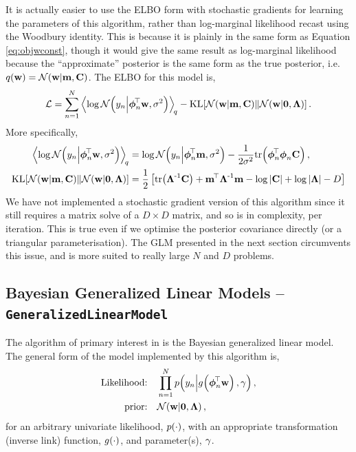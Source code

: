 \documentclass[11pt, oneside]{article}
\begin{document}
It is actually easier to use the ELBO form with stochastic gradients for
learning the parameters of this algorithm, rather than log-marginal likelihood
recast using the Woodbury identity.  This is because it is plainly in the same
form as Equation \eqref{eq:objwconst}, though it would give the same result as
log-marginal likelihood because the ``approximate'' posterior is the same form
as the true posterior, i.e.\ $q\!\left({\mathbf{w}}\right) = \mathcal{N}\!\left({\mathbf{w}}\middle\vert{\ensuremath{\mathbf{m}},
    \ensuremath{\mathbf{C}}}\right)$. The ELBO for this model is,
\begin{equation}
    \elbo = \sum^N_{n=1} 
    \expec{q}{\log\gausC{\targs_n}{\feats_n\T\weights, \var}}
    - \KL{\gausC{\weights}{\pomean, \pocov}}
        {\gausC{\weights}{\mathbf{0}, \Reg}}.
    \label{eq:slmobj}
\end{equation}
More specifically,
\begin{align*}
    \expec{q}{\log\gausC{\targs_n}{\feats_n\T\weights, \var}} &=
    \log \gausC{\targs_n}{\feats_n\T\pomean, \var}
    - \frac{1}{2 \var} \trace{\feats_n\T\feats_n\pocov}, \\
    \KL{\gausC{\weights}{\pomean, \pocov}}
        {\gausC{\weights}{\mathbf{0}, \Reg}} &=
        \frac{1}{2} \sbrac{\trace{\Reg\inv\pocov} + \pomean\T\Reg\inv\pomean 
        -  \log\deter{\pocov} + \log\deter{\Reg} - D}
\end{align*}
We have not implemented a stochastic gradient version of this algorithm since
it still requires a matrix solve of a $D \times D$ matrix, and so is 
in complexity, per iteration. This is true even if we optimise the posterior
covariance directly (or a triangular parameterisation). The GLM presented in
the next section circumvents this issue, and is more suited to really large $N$
and $D$ problems.


\subsection{Bayesian Generalized Linear Models --
    \texttt{GeneralizedLinearModel}}

The algorithm of primary interest in \revrand{} is the Bayesian generalized
linear model. The general form of the model implemented by this algorithm is,
\begin{align}
    \text{Likelihood:} \quad &\prod^N_{n=1} 
        \probC{\targs_n}{\activ{\feats_n\T\weights}, \lparam}, 
        \label{eq:glm_like} \\
    \text{prior:} \quad &\gausC{\weights}{\mathbf{0}, \Reg},
        \label{eq:glm_prior}
\end{align}
for an arbitrary univariate likelihood, $p\!\left({\cdot}\right)$, with an appropriate
transformation (inverse link) function, ${g}_{}\!\left({{\cdot}}\right)$, and parameter(s),
$\gamma$. 
\end{document}
